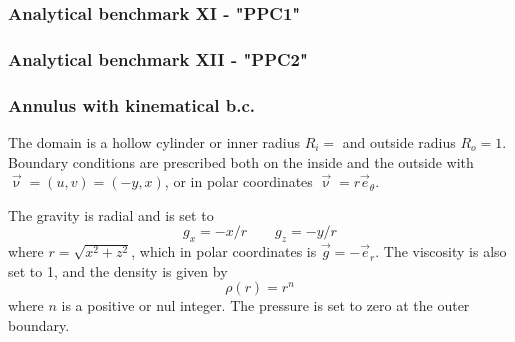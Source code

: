 \subsubsection{Analytical benchmark XI \label{mms11} - "PPC1"}



\subsubsection{Analytical benchmark XII \label{mms11} - "PPC2"}



\subsubsection{Annulus with kinematical b.c.}

The domain is a hollow cylinder or inner radius $R_{i}=$ and outside radius $R_{o}=1$.
Boundary conditions are prescribed both on the inside and the outside with 
${\vec \upnu}=(u,v)=(-y,x)$, or in 
polar coordinates ${\vec \upnu}=r {\vec e}_\theta$.

The gravity is radial and is set to
\[
g_x=-x/r  \quad\quad g_z=-y/r
\]
where $r=\sqrt{x^2+z^2}$, which in polar coordinates is ${\vec g}=-{\vec e}_r$.
The viscosity is also set to 1, and the density is given by
\[
\rho(r)=r^n
\]
where $n$ is a positive or nul integer. The pressure is set to zero at the outer boundary.

